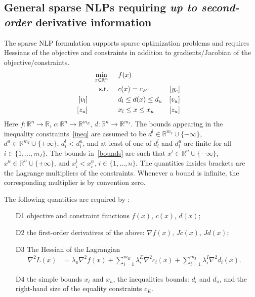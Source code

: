 \subsection{General sparse NLPs requiring \textit{up to second-order} derivative information}
The sparse NLP formulation supports sparse optimization problems and requires Hessians of the objective and constraints in addition to gradients/Jacobian of the objective/constraints.
\begin{align}
&&&&\min_{x\in\mathbb{R}^n} & \hspace{0.5cm} f(x) &&&& \label{spobj}\\
&&&&\textnormal{s.t.} &\hspace{0.5cm}  c(x)=c_E &[y_c]&&&\\
&&[v_l]&&& \hspace{0.5cm} d_l \leq d(x) \leq d_u  &[v_u]&&&\label{spineq} \\
&&[z_u]&&& \hspace{0.5cm} x_l \leq x \leq x_u & [z_u] &&&\label{spbounds}
\end{align}
Here $f:\mathbb{R}^n\rightarrow\mathbb{R}$, $c:\mathbb{R}^n\rightarrow\mathbb{R}^{m_E}$, $d:\mathbb{R}^n\rightarrow\mathbb{R}^{m_I}$. The bounds appearing in the inequality constraints~\eqref{ineq} are assumed to be $d^l\in\mathbb{R}^{m_I}\cup\{-\infty\}$, $d^u\in\mathbb{R}^{m_I}\cup\{+\infty\}$, $d_i^l < d_i^u$, and at least of one of $d_i^l$ and $d_i^u$ are finite for all $i\in\{1,\ldots,m_I\}$. The bounds in~\eqref{bounds} are such that $x^l\in\mathbb{R}^{n}\cup\{-\infty\}$, $x^u\in\mathbb{R}^{n}\cup\{+\infty\}$, and $x_i^l < x_i^u$, $i\in\{1,\ldots,n\}$. The quantities insides brackets are the Lagrange multipliers of the constraints. Whenever a bound is infinite, the corresponding multiplier is by convention zero.

The following quantities are required by \Hi:
\begin{itemize}
\item[D1] objective and constraint functions $f(x)$, $c(x)$, $d(x)$;
\item[D2] the first-order derivatives of the above: $\nabla f(x)$, $Jc(x)$, $Jd(x)$;
\item[D3] The Hessian of the Lagrangian
  \begin{align}
\nabla^2 L(x)& = \lambda_0 \nabla^2 f(x) + \sum_{i=1}^{m_E} \lambda_i^E \nabla^2 c_i(x) + \sum_{i=1}^{m_I} \lambda_i^I \nabla^2 d_i(x).\label{spHess}
\end{align}
\item[D4] the simple bounds $x_l$ and $x_u$, the inequalities bounds: $d_l$ and $d_u$, and the right-hand size of the equality constraints $c_E$.
\end{itemize}

